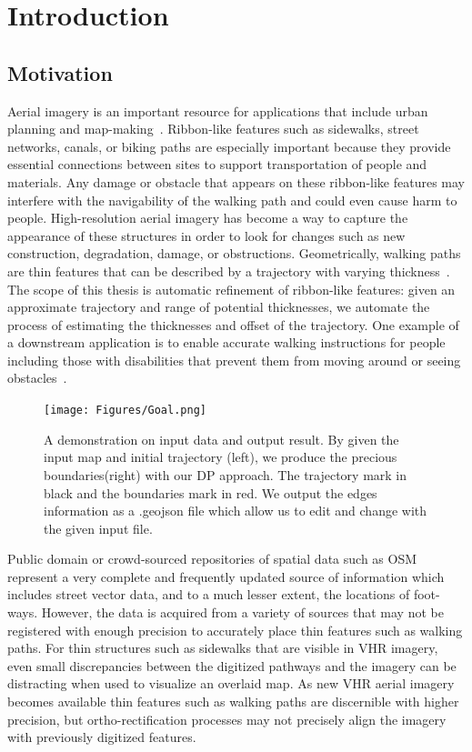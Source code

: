 \chapter{Introduction}

\section{Motivation}
Aerial imagery is an important resource for applications that include urban planning and map-making~\cite{5523977}. 
Ribbon-like features such as sidewalks, street networks, canals, or biking paths are especially important because they provide essential connections between sites to support transportation of people and materials. 
Any damage or obstacle that appears on these ribbon-like features may interfere with the navigability of the walking path and could even cause harm to people.
High-resolution aerial imagery has become a way to capture the appearance of these structures in order to look for changes such as new construction, degradation, damage, or obstructions. 
Geometrically, walking paths are thin features that can be described by a trajectory with varying thickness~\cite{10.1007/11744078_9}. 
The scope of this thesis is automatic refinement of ribbon-like features: given an approximate trajectory and range of potential thicknesses, we automate the process of estimating the thicknesses and offset of the trajectory. 
One example of a downstream application is to enable accurate walking instructions for people including those with disabilities that prevent them from moving around or seeing obstacles~\cite{ZOU2012227}. 

\begin{figure}
    \centering
    \texttt{[image: Figures/Goal.png]}
    \caption[Objective Demonstration]{A demonstration  on input data and output result. By given the input map and initial trajectory (left), we produce the precious boundaries(right) with our \ac{DP} approach. The trajectory mark in black and the boundaries mark in red. We output the edges information as a .geojson file which allow us to edit and change with the given input file.}
    \label{fig:goal}
\end{figure}


Public domain or crowd-sourced repositories of spatial data such as \ac{OSM}~\cite{OpenStreetMap} represent a very complete and frequently updated source of information which includes street vector data, and to a much lesser extent, the locations of foot-ways.
However, the data is acquired from a variety of sources that may not be registered with enough precision to accurately place thin features such as walking paths. For thin structures such as sidewalks that are visible in \ac{VHR} imagery, even small discrepancies between the digitized pathways and the imagery can be distracting when used to visualize an overlaid map.
As new \ac{VHR} aerial imagery becomes available thin features such as walking paths are discernible with higher precision, but ortho-rectification processes may not precisely align the imagery with previously digitized features. 

